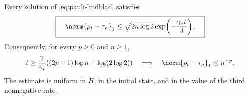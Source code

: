 \documentclass[class=article,11pt,a4paper,crop=false]{standalone}
\begin{document}
\begin{theorem}
\label{thm:q3-solved}
Every solution of \eqref{eq:pauli-lindblad} satisfies
\begin{equation}\label{eq:q3-trace-bound}
 \boxed{\quad
 \norm{\rho_t-\tau_n}_1
 \le \sqrt{2n\log 2} \exp\!\left(-\frac{\gamma_*t}{4}\right).
 \quad}
\end{equation}
Consequently, for every $p\ge0$ and $n\ge1$,
\begin{equation}\label{eq:q3-threshold}
 t\ge \frac{2}{\gamma_*}
 ((2p+1)\log n+\log(2\log2))
 \quad\Longrightarrow\quad
 \norm{\rho_t-\tau_n}_1\le n^{-p}.
\end{equation}
The estimate is uniform in $H$, in the initial state, and in the value of the
third nonnegative rate.
\end{theorem}
\end{document}
